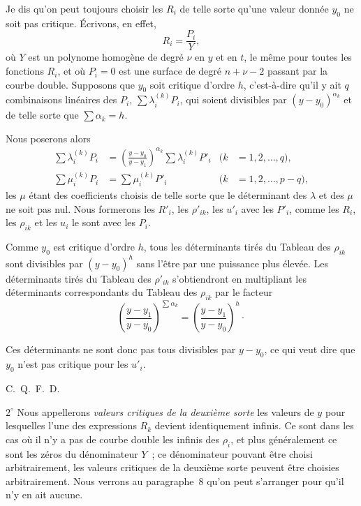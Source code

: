 \documentclass{article}
\begin{document}
Je dis qu'on peut toujours choisir les $R_{i}$ de telle sorte qu'une valeur donnée $y_{0}$ ne soit pas critique. Écrivons, en effet,
\[
R_{i} = \frac{P_{i}}{Y},
\]
où $Y$ est un polynome homogène de degré $\nu$ en $y$ et en $t$, le même pour toutes les fonctions $R_{i}$, et où $P_{i} = 0$ est une surface de degré $n + \nu - 2$ passant par la courbe double. Supposons que $y_{0}$ soit critique d'ordre $h$, c'est-à-dire qu'il y ait $q$ combinaisons linéaires des $P_{i}$, $\displaystyle\sum \lambda_{i}^{(k)} P_{i}$, qui soient divisibles par $(y - y_{0})^{\alpha_{k}}$ et de telle sorte que $\displaystyle\sum \alpha_{k} = h$.

Nous poserons alors
\[
\begin{aligned}
\sum \lambda_{i}^{(k)} P_{i} &= \left(\frac{y - y_{0}}{y - y_{1}}\right)^{\alpha_{k}} \sum \lambda_{i}^{(k)} P'_{i} & (k &= 1, 2, \ldots, q), \\
\sum \mu_{i}^{(k)} P_{i} &= \sum \mu_{i}^{(k)} P'_{i} & (k &= 1, 2, \ldots, p - q),
\end{aligned}
\]
les $\mu$ étant des coefficients choisis de telle sorte que le déterminant des $\lambda$ et des $\mu$ ne soit pas nul. Nous formerons les $R'_{i}$, les $\rho'_{ik}$, les $u'_{i}$ avec les $P'_{i}$, comme les $R_{i}$, les $\rho_{ik}$ et les $u_{i}$ le sont avec les $P_{i}$.

Comme $y_{0}$ est critique d'ordre $h$, tous les déterminants tirés du Tableau des $\rho_{ik}$ sont divisibles par $(y - y_{0})^{h}$ sans l'être par une puissance plus élevée. Les déterminants tirés du Tableau des $\rho'_{ik}$ s'obtiendront
en multipliant les déterminants correspondants du Tableau des $\rho_{ik}$ par le facteur
\[
\left(\frac{y - y_{1}}{y - y_{0}}\right)^{\sum \alpha_{k}} = \left(\frac{y - y_{1}}{y - y_{0}}\right)^{h} \cdot
\]

Ces déterminants ne sont donc pas tous divisibles par $y - y_{0}$, ce qui veut dire que $y_{0}$ n'est pas critique pour les $u'_{i}$.

\hfill C.~Q.~F.~D.

$2^\circ$ Nous appellerons \emph{valeurs critiques de la deuxième sorte} les valeurs de $y$ pour lesquelles l'une des expressions $R_{k}$ devient identiquement infinis. Ce sont dans les cas où il n'y a pas de courbe double les infinis des $\rho_{i}$, et plus généralement ce sont les zéros du dénominateur $Y$~; ce dénominateur pouvant être choisi arbitrairement, les valeurs critiques de la deuxième sorte peuvent être choisies arbitrairement. Nous verrons au paragraphe~8 qu'on peut s'arranger pour qu'il n'y en ait aucune.
\end{document}
